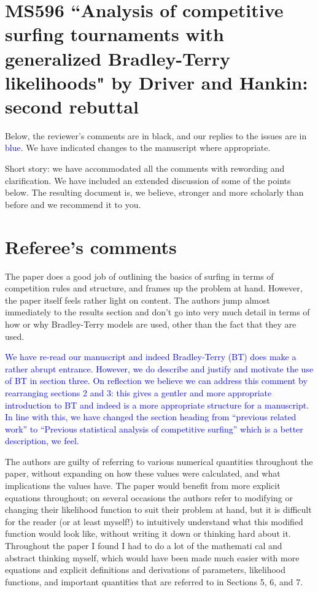 \documentclass[12pt]{article}
\begin{document}
\section*{MS596 ``Analysis of competitive surfing tournaments
  with generalized Bradley-Terry likelihoods" by Driver and
  Hankin: second rebuttal}

Below, the reviewer's comments are in black, and our replies to the
issues are in \textcolor{blue}{blue}.  We have indicated changes to
the manuscript where appropriate.  

Short story: we have accommodated all the comments with rewording and
clarification.  We have included an extended discussion of some of the
points below.  The resulting document is, we believe, stronger and
more scholarly than before and we recommend it to you.


\section*{Referee's comments}

The paper does a good job of outlining the basics of surfing in terms
of competition rules and structure, and frames up the problem at
hand.  However, the paper itself feels rather light on content.  The
authors jump almost immediately to the results section and don't go
into very much detail in terms of how or why Bradley-Terry models are
used, other than the fact that they are used.

\textcolor{blue}{We have re-read our manuscript and indeed
  Bradley-Terry (BT) does make a rather abrupt entrance.  However, we
  do describe and justify and motivate the use of BT in section three.
  On reflection we believe we can address this comment by rearranging
  sections 2 and 3: this gives a gentler and more appropriate
  introduction to BT and indeed is a more appropriate structure for a
  manuscript.  In line with this, we have changed the section heading
  from ``previous related work'' to ``Previous statistical analysis of
  competitive surfing'' which is a better description, we feel.}

The authors are guilty
of referring to various numerical quantities throughout the paper,
without expanding on how these values were calculated, and what
implications the values have. The paper would benefit from more
explicit equations throughout; on several occasions the authors refer
to modifying or changing their likelihood function to suit their
problem at hand, but it is difficult for the reader (or at least
myself!) to intuitively understand what this modified function would
look like, without writing it down or thinking hard about
it. Throughout the paper I found I had to do a lot of the mathemati
cal and abstract thinking myself, which would have been made much
easier with more equations and explicit definitions and derivations of
parameters, likelihood functions, and important quantities that are
referred to in Sections 5, 6, and 7.
\end{document}
